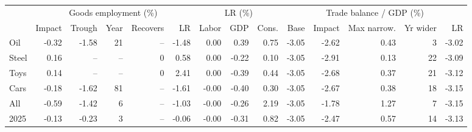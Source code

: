\begin{tabular}{lrrrrrrrrrrrrr}
\toprule
 & \multicolumn{5}{c}{Goods employment (\%)} & \multicolumn{3}{c}{LR (\%)} & \multicolumn{5}{c}{Trade balance / GDP (\%)} \\
\cmidrule(lr){2-6}\cmidrule(lr){7-9}\cmidrule(lr){10-14}
 & Impact & Trough & Year & Recovers & LR & Labor & GDP & Cons. & Base & Impact & Max narrow. & Yr wider & LR \\
\midrule
Oil & -0.32 & -1.58 & 21 & -- & -1.48 & 0.00 & 0.39 & 0.75 & -3.05 & -2.62 & 0.43 & 3 & -3.02 \\
Steel & 0.16 & -- & -- & 0 & 0.58 & 0.00 & -0.22 & 0.10 & -3.05 & -2.91 & 0.13 & 22 & -3.09 \\
Toys & 0.14 & -- & -- & 0 & 2.41 & 0.00 & -0.39 & 0.44 & -3.05 & -2.68 & 0.37 & 21 & -3.12 \\
Cars & -0.18 & -1.62 & 81 & -- & -1.61 & -0.00 & -0.40 & 0.30 & -3.05 & -2.67 & 0.38 & 18 & -3.15 \\
All & -0.59 & -1.42 & 6 & -- & -1.03 & -0.00 & -0.26 & 2.19 & -3.05 & -1.78 & 1.27 & 7 & -3.15 \\
2025 & -0.13 & -0.23 & 3 & -- & -0.06 & -0.00 & -0.31 & 0.82 & -3.05 & -2.47 & 0.57 & 14 & -3.13 \\
\bottomrule
\end{tabular}
